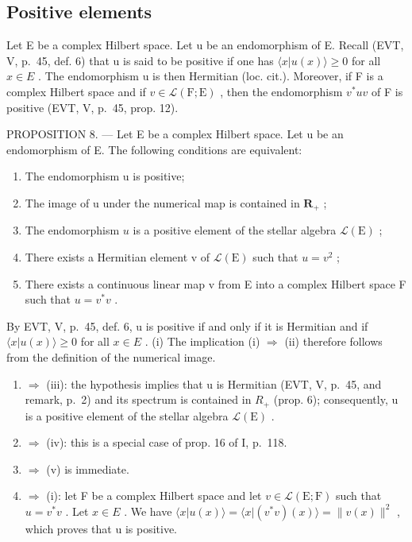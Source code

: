 \subsection{Positive elements}

Let E be a complex Hilbert space. Let u be an endomorphism of E. Recall (EVT, V, p.~45, def. 6) that u is said to be positive if one has \(\langle x|u(x)\rangle\geqslant0\) for all \(x\in E\) . The endomorphism u is then Hermitian (loc. cit.). Moreover, if F is a complex Hilbert space and if \(v\in\mathcal{L}(\mathrm{F};\mathrm{E})\) , then the endomorphism \(v^{*}uv\) of F is positive (EVT, V, p.~45, prop. 12).

PROPOSITION 8. --- Let E be a complex Hilbert space. Let u be an endomorphism of E. The following conditions are equivalent:

\begin{enumerate}
\def\labelenumi{(\roman{enumi})}
\item
  The endomorphism u is positive;
\item
  The image of u under the numerical map is contained in \(\mathbf{R}_{+}\) ;
\item
  The endomorphism \(u\) is a positive element of the stellar algebra \(\mathcal{L}(\mathrm{E})\) ;
\item
  There exists a Hermitian element v of \(\mathcal{L}(\mathrm{E})\) such that \(u = v^2\) ;
\item
  There exists a continuous linear map v from E into a complex Hilbert space F such that \(u = v^{*}v\) .
\end{enumerate}

By EVT, V, p.~45, def. 6, u is positive if and only if it is Hermitian and if \(\langle x|u(x)\rangle\geqslant0\) for all \(x\in E\) . (i) The implication (i) \(\Longrightarrow\) (ii) therefore follows from the definition of the numerical image.

\begin{enumerate}
\def\labelenumi{(\roman{enumi})}
\setcounter{enumi}{1}
\item
  \(\Longrightarrow\) (iii): the hypothesis implies that u is Hermitian (EVT, V, p.~45, and remark, p.~2) and its spectrum is contained in \(R_{+}\) (prop. 6); consequently, u is a positive element of the stellar algebra \(\mathcal{L}(\mathrm{E})\) .
\item
  \(\Longrightarrow\) (iv): this is a special case of prop. 16 of I, p.~118.
\item
  \(\Longrightarrow\) (v) is immediate.
\item
  \(\Longrightarrow\) (i): let F be a complex Hilbert space and let \(v \in \mathcal{L}(\mathrm{E};\mathrm{F})\) such that \(u = v^{*}v\) . Let \(x \in E\) . We have \(\langle x|u(x)\rangle = \langle x|(v^{*}v)(x)\rangle = \|v(x)\|^{2}\) , which proves that u is positive.
\end{enumerate}


